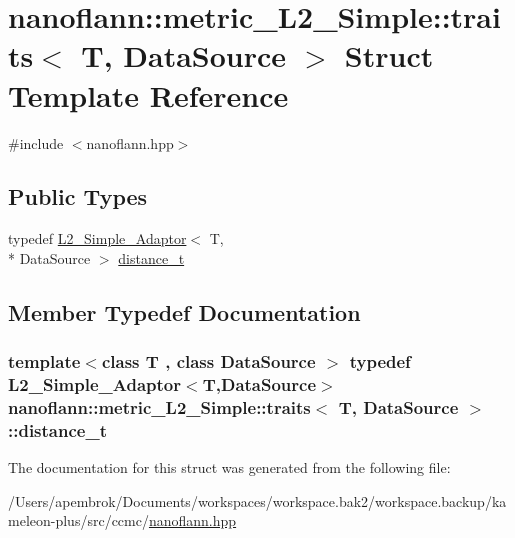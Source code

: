 \hypertarget{structnanoflann_1_1metric___l2___simple_1_1traits}{\section{nanoflann\-:\-:metric\-\_\-\-L2\-\_\-\-Simple\-:\-:traits$<$ T, Data\-Source $>$ Struct Template Reference}
\label{structnanoflann_1_1metric___l2___simple_1_1traits}
}


{\ttfamily \#include $<$nanoflann.\-hpp$>$}

\subsection*{Public Types}
\begin{DoxyCompactItemize}
\item 
typedef \hyperlink{structnanoflann_1_1_l2___simple___adaptor}{L2\-\_\-\-Simple\-\_\-\-Adaptor}$<$ T, \\*
Data\-Source $>$ \hyperlink{structnanoflann_1_1metric___l2___simple_1_1traits_aae46920bee1091763a689b896d3b05c9}{distance\-\_\-t}
\end{DoxyCompactItemize}


\subsection{Member Typedef Documentation}
\hypertarget{structnanoflann_1_1metric___l2___simple_1_1traits_aae46920bee1091763a689b896d3b05c9}{
\subsubsection[{distance\-\_\-t}]{\setlength{\rightskip}{0pt plus 5cm}template$<$class T , class Data\-Source $>$ typedef {\bf L2\-\_\-\-Simple\-\_\-\-Adaptor}$<$T,Data\-Source$>$ {\bf nanoflann\-::metric\-\_\-\-L2\-\_\-\-Simple\-::traits}$<$ T, Data\-Source $>$\-::{\bf distance\-\_\-t}}}\label{structnanoflann_1_1metric___l2___simple_1_1traits_aae46920bee1091763a689b896d3b05c9}


The documentation for this struct was generated from the following file\-:\begin{DoxyCompactItemize}
\item 
/\-Users/apembrok/\-Documents/workspaces/workspace.\-bak2/workspace.\-backup/kameleon-\/plus/src/ccmc/\hyperlink{nanoflann_8hpp}{nanoflann.\-hpp}\end{DoxyCompactItemize}
